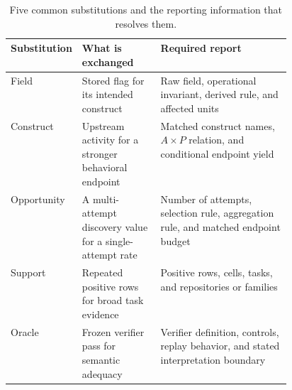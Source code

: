 \begin{table}[H]
\centering
\caption{Five common substitutions and the reporting information that resolves them.}
\label{tab:substitutions}
\small
\begin{tabularx}{\linewidth}{@{}L{0.17\linewidth}L{0.29\linewidth}Y@{}}
\toprule
Substitution & What is exchanged & Required report \\
\midrule
Field & Stored flag for its intended construct & Raw field, operational invariant, derived rule, and affected units \\
Construct & Upstream activity for a stronger behavioral endpoint & Matched construct names, $A\times P$ relation, and conditional endpoint yield \\
Opportunity & A multi-attempt discovery value for a single-attempt rate & Number of attempts, selection rule, aggregation rule, and matched endpoint budget \\
Support & Repeated positive rows for broad task evidence & Positive rows, cells, tasks, and repositories or families \\
Oracle & Frozen verifier pass for semantic adequacy & Verifier definition, controls, replay behavior, and stated interpretation boundary \\
\bottomrule
\end{tabularx}
\end{table}

